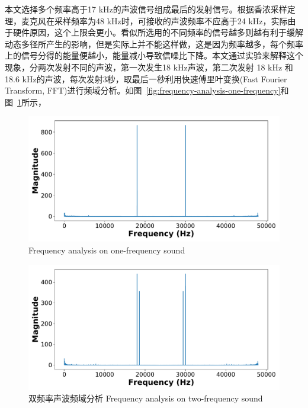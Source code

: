本文选择多个频率高于17 kHz的声波信号组成最后的发射信号。根据香浓采样定理，麦克风在采样频率为48 kHz时，可接收的声波频率不应高于24 kHz，实际由于硬件原因，这个上限会更小。看似所选用的不同频率的信号越多则越有利于缓解动态多径所产生的影响，但是实际上并不能这样做，这是因为频率越多，每个频率上的信号分得的能量便越小，能量减小导致信噪比下降。本文通过实验来解释这个现象，分两次发射不同的声波，第一次发生18 kHz声波，第二次发射 18 kHz 和 18.6 kHz的声波，每次发射3秒，取最后一秒利用快速傅里叶变换(Fast Fourier Transform, FFT)进行频域分析。如图~\ref{fig:frequency-analysis-one-frequency}和图~\ref{fig:frequency-analysis-two-frequency}所示，
\begin{figure}[!htp]
  \centering
  \begin{minipage}[t]{0.49\textwidth}
    \centering
    \includegraphics[width=\textwidth]{figure/one-freq-fft.pdf}
      {Frequency analysis on one-frequency sound}
        \label{fig:frequency-analysis-one-frequency}
  \end{minipage}
  \centering
  \begin{minipage}[t]{0.49\textwidth}
    \centering
    \includegraphics[width=\textwidth]{figure/two-freq-fft.pdf}
    \bicaption
    {双频率声波频域分析}
    {Frequency analysis on two-frequency sound}
    \label{fig:frequency-analysis-two-frequency}
   \end{minipage}
\end{figure}
